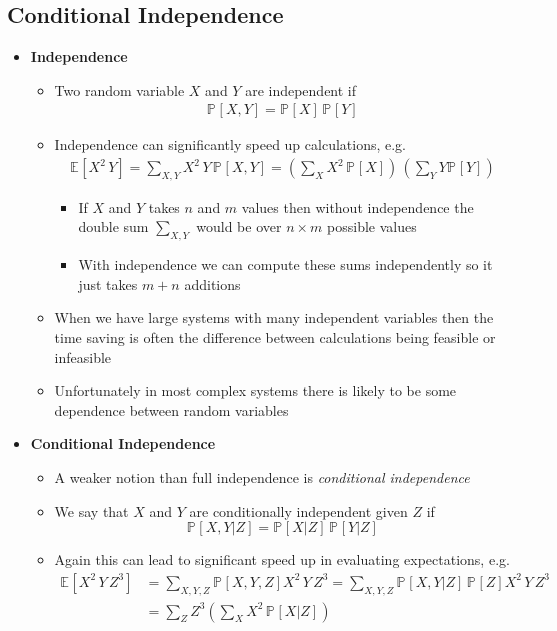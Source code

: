 \documentclass[11pt]{article}
\newcommand{\av}[2][]{\mathbb{E}_{#1\!}\left[ #2 \right]}
\newcommand{\Prob}[2][]{\mathbb{P}_{#1\!}\left[ #2 \right]}
\begin{document}
\subsection{Conditional Independence}
\label{sec:orgfccc68a}
\begin{itemize}
\item \textbf{Independence}
\begin{itemize}
\item Two random variable \(X\) and \(Y\) are independent if
\begin{align*}
\Prob{X,Y} = \Prob{X}\,\Prob{Y}
\end{align*}
\item Independence can significantly speed up calculations, e.g.
\begin{align*}
\av{X^2\,Y} = \sum_{X,Y} X^2\,Y\,\Prob{X,Y} 
= \left( \sum_{X} X^{2} \, \Prob{X} \right)\, \left( \sum_{Y} Y \Prob{Y} \right)
\end{align*}
\begin{itemize}
\item If \(X\) and \(Y\) takes \(n\) and \(m\) values then without
independence the double sum \(\sum_{X,Y}\) would be over
\(n\times m\) possible values
\item With independence we can compute these sums independently so
it just takes \(m+n\)  additions
\end{itemize}
\item When we have large systems with many independent variables
then the time saving is often the difference between
calculations being feasible or infeasible
\item Unfortunately in most complex systems there is likely to be
some dependence between random variables
\end{itemize}
\item \textbf{Conditional Independence}
\begin{itemize}
\item A weaker notion than full independence is \emph{conditional independence}
\item We say that \(X\) and \(Y\) are conditionally independent given
\(Z\) if
$$ \Prob{X,Y|Z} = \Prob{X|Z}\,\Prob{Y|Z} $$
\item Again this can lead to significant speed up in evaluating
expectations, e.g.
\begin{align*}
\av{X^{2}\,Y\,Z^{3}} &= \sum_{X,Y,Z} \Prob{X,Y,Z} X^{2}\,Y\,Z^{3}
= \sum_{X,Y,Z} \Prob{X,Y|Z}\,\Prob{Z} X^{2}\,Y\,Z^{3} \\
&= \sum_{Z} Z^{3} \left( \sum_{X} X^{2}\,\Prob{X|Z}\right)

\end{align*}
\end{itemize}
\end{itemize}
\end{document}
